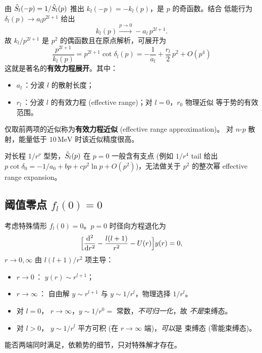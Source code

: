 由 $\hat{S}_l(-p)=1/\hat{S}_l(p)$ 推出 $k_l(-p)=-k_l(p)$，是 $p$ 的奇函数。结合
低能行为 $\delta_l(p)\to a_l p^{2l+1}$ 给出
\begin{equation}
k_l(p)\xrightarrow{p\to 0} -a_l\,p^{2l+1}.
\label{eq:kl-low}
\end{equation}
故 $k_l/p^{2l+1}$ 是 $p^2$ 的偶函数且在原点解析，可展开为
\begin{equation}
\boxed{\;\frac{p^{2l+1}}{k_l(p)} = p^{2l+1}\cot\delta_l(p)
= -\frac{1}{a_l}+\frac{r_l}{2}\,p^2+O(p^4)\;}
\label{eq:eff-range-ch11}
\end{equation}
这就是著名的\textbf{有效力程展开}。其中：
\begin{itemize}
\item $a_l$\,：分波 $l$ 的散射长度；
\item $r_l$\,：分波 $l$ 的有效力程 (effective range)；对 $l=0$，$r_0$ 物理近似
等于势的有效范围。
\end{itemize}
仅取前两项的近似称为\textbf{有效力程近似} (effective range approximation)。
对 $n$-$p$ 散射，能量低于 $10\,\mathrm{MeV}$ 时该近似精度很高。

\begin{remark}[$1/r^\nu$ tail 破坏 $p^2$ 展开]
对长程 $1/r^\nu$ 型势，$\hat{S}_l(p)$ 在 $p=0$ 一般含有支点 (例如
$1/r^4$ tail 给出 $p\cot\delta_0=-1/a_0+bp+cp^2\ln p+O(p^2)$)，无法做关于
$p^2$ 的整次幂 effective range expansion。
\end{remark}

\subsection{阈值零点 $f_l(0)=0$}\label{ssec:threshold-zero}

考虑特殊情形 $f_l(0)=0$。$p=0$ 时径向方程退化为
\begin{equation}
\Bigl[\frac{\mathrm{d}^2}{\mathrm{d} r^2}-\frac{l(l+1)}{r^2}-U(r)\Bigr]y(r)=0,
\end{equation}
$r\to 0,\infty$ 由 $l(l+1)/r^2$ 项主导：
\begin{itemize}
\item $r\to 0$\,： $y(r)\sim r^{l+1}$；
\item $r\to\infty$\,： 自由解 $y\sim r^{l+1}$ 与 $y\sim 1/r^l$，物理选择
$1/r^l$。
\item 对 $l=0$， $r\to\infty$，$y\sim 1/r^0=$ 常数，\emph{不可归一化}，故
\emph{不是}束缚态。
\item 对 $l>0$， $y\sim 1/r^l$ 平方可积 (在 $r\to\infty$ 端)，\emph{可以}是
束缚态 (零能束缚态)。
\end{itemize}
能否两端同时满足，依赖势的细节，只对特殊解才存在。

